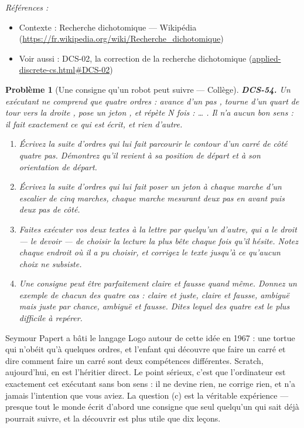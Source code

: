 \documentclass[11pt]{article}
\newtheorem{problem}{Problème}
\newenvironment{refs}{\par\small\noindent\emph{Références :}\begin{itemize}\setlength\itemsep{0pt}}{\end{itemize}\normalsize}
\begin{document}
\begin{refs}
\item Contexte : Recherche dichotomique --- Wikipédia (\url{https://fr.wikipedia.org/wiki/Recherche_dichotomique})
\item Voir aussi : DCS-02, la correction de la recherche dichotomique (\url{applied-discrete-cs.html#DCS-02})
\end{refs}

\bigskip

\begin{problem}[{Une consigne qu'un robot peut suivre --- Collège}]
\textbf{DCS-54.} Un exécutant ne comprend que quatre ordres : \og{} avance d'un pas \fg{},
\og{} tourne d'un quart de tour vers la droite \fg{}, \og{} pose un jeton \fg{}, et \og{} répète N fois : \dots{} \fg{}.
Il n'a aucun bon sens : il fait exactement ce qui est écrit, et rien d'autre.
\begin{enumerate}
\item[(a)] Écrivez la suite d'ordres qui lui fait parcourir le contour d'un carré de côté quatre
pas. Démontrez qu'il revient à sa position de départ \textit{et} à son orientation de
départ.
\item[(b)] Écrivez la suite d'ordres qui lui fait poser un jeton à chaque marche d'un escalier de
cinq marches, chaque marche mesurant deux pas en avant puis deux pas de côté.
\item[(c)] Faites exécuter vos deux textes à la lettre par quelqu'un d'autre, qui a le droit --- le
devoir --- de choisir la lecture la plus bête chaque fois qu'il hésite. Notez chaque endroit
où il a pu choisir, et corrigez le texte jusqu'à ce qu'aucun choix ne subsiste.
\item[(d)] Une consigne peut être parfaitement claire et fausse quand même. Donnez un exemple de
chacun des quatre cas : claire et juste, claire et fausse, ambiguë mais juste par chance,
ambiguë et fausse. Dites lequel des quatre est le plus difficile à repérer.
\end{enumerate}

\end{problem}

\noindent Seymour Papert a bâti le langage Logo autour de cette idée en 1967 : une
tortue qui n'obéit qu'à quelques ordres, et l'enfant qui découvre que \og{} faire un carré \fg{} et
\og{} dire comment faire un carré \fg{} sont deux compétences différentes. Scratch, aujourd'hui, en
est l'héritier direct. Le point sérieux, c'est que l'ordinateur est exactement cet exécutant
sans bon sens : il ne devine rien, ne corrige rien, et n'a jamais l'intention que vous aviez.
La question (c) est la véritable expérience --- presque tout le monde écrit d'abord une
consigne que seul quelqu'un qui sait déjà pourrait suivre, et la découvrir est plus utile
que dix leçons.
\end{document}
